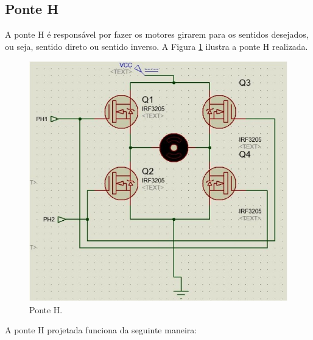 \subsection{Ponte H}

A ponte H é responsável por fazer os motores girarem para os sentidos desejados, ou seja, sentido direto ou sentido inverso.
A Figura \ref{fig:ponte} ilustra a ponte H realizada.

\begin{figure}[h!]
  \centering
    \includegraphics[scale=0.5]{figuras/Ponte_H.jpg}
  \caption{Ponte H.}
    \label{fig:ponte}
\end{figure}

A ponte H projetada funciona da seguinte maneira:

